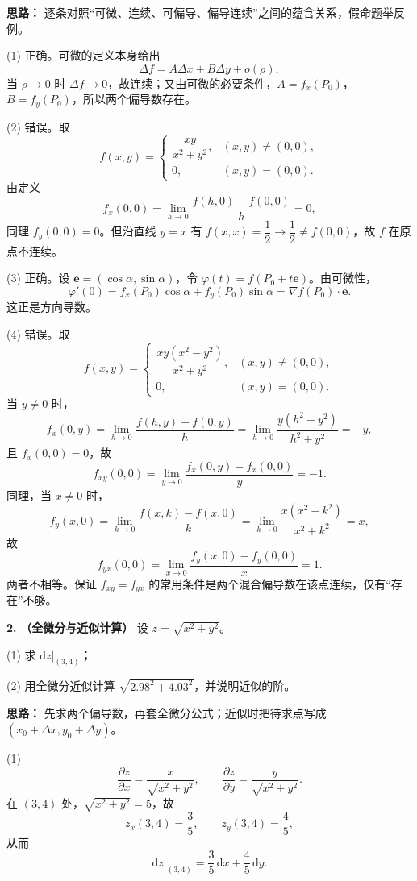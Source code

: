 \ifshowsolutions%
\textbf{思路：} 逐条对照“可微、连续、可偏导、偏导连续”之间的蕴含关系，假命题举反例。

(1) 正确。可微的定义本身给出
\[
\varDelta f=A\varDelta x+B\varDelta y+o(\rho),
\]
当 \(\rho\to0\) 时 \(\varDelta f\to0\)，故连续；又由可微的必要条件，\(A=f_x(P_0)\)，\(B=f_y(P_0)\)，所以两个偏导数存在。

(2) 错误。取
\[
f(x,y)=\begin{cases}
\dfrac{xy}{x^2+y^2},&(x,y)\neq(0,0),\\[6pt]
0,&(x,y)=(0,0).
\end{cases}
\]
由定义
\[
f_x(0,0)=\lim_{h\to0}\frac{f(h,0)-f(0,0)}{h}=0,
\]
同理 \(f_y(0,0)=0\)。但沿直线 \(y=x\) 有 \(f(x,x)=\dfrac12\to\dfrac12\neq f(0,0)\)，故 \(f\) 在原点不连续。

(3) 正确。设 \(\mathbf e=(\cos\alpha,\sin\alpha)\)，令 \(\varphi(t)=f(P_0+t\mathbf e)\)。由可微性，
\[
\varphi'(0)=f_x(P_0)\cos\alpha+f_y(P_0)\sin\alpha=\nabla f(P_0)\cdot\mathbf e.
\]
这正是方向导数。

(4) 错误。取
\[
f(x,y)=\begin{cases}
\dfrac{xy(x^2-y^2)}{x^2+y^2},&(x,y)\neq(0,0),\\[6pt]
0,&(x,y)=(0,0).
\end{cases}
\]
当 \(y\neq0\) 时，
\[
f_x(0,y)=\lim_{h\to0}\frac{f(h,y)-f(0,y)}{h}
=\lim_{h\to0}\frac{y(h^2-y^2)}{h^2+y^2}=-y,
\]
且 \(f_x(0,0)=0\)，故
\[
f_{xy}(0,0)=\lim_{y\to0}\frac{f_x(0,y)-f_x(0,0)}{y}=-1.
\]
同理，当 \(x\neq0\) 时，
\[
f_y(x,0)=\lim_{k\to0}\frac{f(x,k)-f(x,0)}{k}
=\lim_{k\to0}\frac{x(x^2-k^2)}{x^2+k^2}=x,
\]
故
\[
f_{yx}(0,0)=\lim_{x\to0}\frac{f_y(x,0)-f_y(0,0)}{x}=1.
\]
两者不相等。保证 \(f_{xy}=f_{yx}\) 的常用条件是两个混合偏导数在该点连续，仅有“存在”不够。

\else \answerarea[8] \fi%

\textbf{2.} \textbf{（全微分与近似计算）} 设 \(z=\sqrt{x^2+y^2}\)。

(1) 求 \(\mathrm dz\big|_{(3,4)}\)；

(2) 用全微分近似计算 \(\sqrt{2.98^2+4.03^2}\)，并说明近似的阶。

\ifshowsolutions%
\textbf{思路：} 先求两个偏导数，再套全微分公式；近似时把待求点写成 \((x_0+\varDelta x,y_0+\varDelta y)\)。

(1)
\[
\frac{\partial z}{\partial x}=\frac{x}{\sqrt{x^2+y^2}},\qquad
\frac{\partial z}{\partial y}=\frac{y}{\sqrt{x^2+y^2}}.
\]
在 \((3,4)\) 处，\(\sqrt{x^2+y^2}=5\)，故
\[
z_x(3,4)=\frac35,\qquad z_y(3,4)=\frac45,
\]
从而
\[
\mathrm dz\big|_{(3,4)}=\frac35\,\mathrm dx+\frac45\,\mathrm dy.
\]

